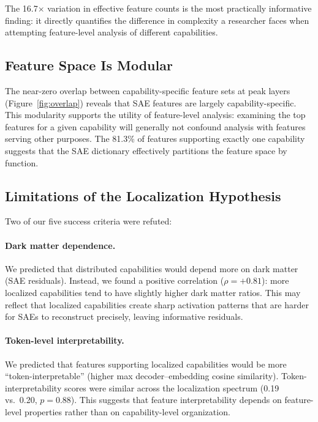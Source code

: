 \documentclass{article}
\begin{document}
The 16.7$\times$ variation in effective feature counts is the most practically informative finding: it directly quantifies the difference in complexity a researcher faces when attempting feature-level analysis of different capabilities.

\subsection{Feature Space Is Modular}

The near-zero overlap between capability-specific feature sets at peak layers (Figure~\ref{fig:overlap}) reveals that SAE features are largely capability-specific. This modularity supports the utility of feature-level analysis: examining the top features for a given capability will generally not confound analysis with features serving other purposes. The 81.3\% of features supporting exactly one capability suggests that the SAE dictionary effectively partitions the feature space by function.

\subsection{Limitations of the Localization Hypothesis}

Two of our five success criteria were refuted:

\paragraph{Dark matter dependence.} We predicted that distributed capabilities would depend more on dark matter (SAE residuals). Instead, we found a positive correlation ($\rho = +0.81$): more localized capabilities tend to have slightly higher dark matter ratios. This may reflect that localized capabilities create sharp activation patterns that are harder for SAEs to reconstruct precisely, leaving informative residuals.

\paragraph{Token-level interpretability.} We predicted that features supporting localized capabilities would be more ``token-interpretable'' (higher max decoder--embedding cosine similarity). Token-interpretability scores were similar across the localization spectrum (0.19 vs.\ 0.20, $p = 0.88$). This suggests that feature interpretability depends on feature-level properties rather than on capability-level organization.
\end{document}
